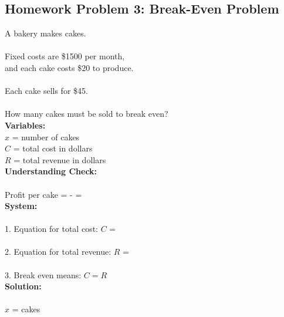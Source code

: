 \documentclass[12pt]{article}
\begin{document}
            \newpage
        
        \subsection*{Homework Problem 3: Break-Even Problem}
        
            A bakery makes cakes.\\\\	
            Fixed costs are \$1500 per month,\\
            and each cake costs \$20 to produce.\\\\
            Each cake sells for \$45.\\\\
            How many cakes must be sold to break even?\\
        
            \textbf{Variables:}\\
            $x$ = number of cakes\\
            $C$ = total cost in dollars\\
            $R$ = total revenue in dollars\\
        
            \textbf{Understanding Check:}\\\\
            Profit per cake = \underline{\hspace{1in}} - \underline{\hspace{1in}} = \underline{\hspace{1in}}\\
        
            \textbf{System:}\\\\
            1. Equation for total cost: $C$ = \underline{\hspace{2in}}\\\\	
            2. Equation for total revenue: $R$ = \underline{\hspace{2in}}\\\\
            3. Break even means: \underline{\hspace{0.3in} $C = R$ \hspace{0.3in}}\\
        
            \textbf{Solution:}\\\\
            $x$ = \underline{\hspace{1in}} cakes\\
\end{document}

